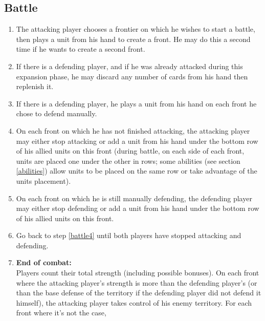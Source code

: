 \documentclass[a4paper]{article}
\begin{document}
    \subsection{Battle}
        \label{battle}
        \begin{enumerate}
            \item The attacking player chooses a frontier on which he wishes to start
                a battle, then plays a unit from his hand to create a front.
                He may do this a second time if he wants to create a second front.
            \item If there is a defending player,
                and if he was already attacked during this expansion phase,
                he may discard any number of cards from his hand then replenish it.
            \item If there is a defending player,
                he plays a unit from his hand on each front he chose to defend manually.
            \item On each front on which he has not finished attacking,
                the attacking player may either stop attacking or add a unit
                from his hand under the bottom row of his allied units on this front
                (during battle, on each side of each front,
                units are placed one under the other in rows; 
                some abilities (see section \ref{abilities}) allow units to be placed
                on the same row or take advantage of the units placement).
                \label{battle4}
            \item On each front on which he is still manually defending,
                the defending player may either stop defending or add a unit
                from his hand under the bottom row of his allied units on this front.
            \item Go back to step \ref{battle4} until both players have stopped
                attacking and defending.
                \label{battle6}
            \item \textbf{End of combat:}\\
                Players count their total strength (including possible bonuses).
                On each front where the attacking player's strength is more than
                the defending player's (or than the base defense of the territory
                if the defending player did not defend it himself),
                the attacking player takes control of his enemy territory.
                For each front where it's not the case,

\end{enumerate}
\end{document}
